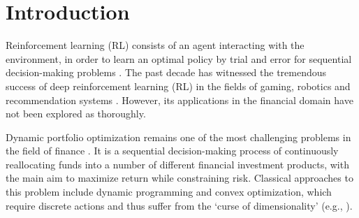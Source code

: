 \documentclass{article}
\begin{document}
\printAffiliationsAndNotice{\icmlEqualContribution} %

\begin{abstract}
{Dynamic portfolio optimization is the process of sequentially allocating wealth to a collection of assets in some consecutive trading periods, based on investors' return-risk profile. Automating this process with machine learning remains a challenging problem. Here, we design a deep reinforcement learning (RL) architecture with an autonomous trading agent such that, investment decisions and actions are made periodically, based on a global objective, with autonomy. In particular, without relying on a purely model-free RL agent, we train our trading agent using a novel RL architecture consisting of an infused prediction module (IPM), a generative adversarial data augmentation module (DAM) and a behavior cloning module (BCM). Our model-based approach works with both on-policy or off-policy RL algorithms. We further design the back-testing and execution engine which interact with the RL agent in real time. Using historical {\em real} financial market data, we simulate trading with practical constraints, and demonstrate that our proposed model is robust, profitable and risk-sensitive, as compared to baseline trading strategies and model-free RL agents from prior work.} 
\end{abstract}

\section{Introduction}

Reinforcement learning (RL) {consists of} an agent interacting with the environment, {in order to learn} an optimal policy by trial and error for sequential decision-making problems \cite{bertsekas2005dynamic, sutton2018reinforcement}. The past decade has witnessed the tremendous success of deep reinforcement learning (RL) in the fields of gaming, robotics and recommendation systems \cite{lillicrap2015continuous, silver2016mastering, mnih2015human, mnih2016asynchronous}. {However,} its applications in the financial domain have not been explored as thoroughly. 

Dynamic portfolio optimization remains one of the most challenging problems in the field of finance \cite{markowitz1959portfolio, haugen1990modern}. It is a sequential decision-making process of continuously reallocating funds into a number of different financial investment products, with the main aim to maximize return while constraining risk. Classical approaches to this problem include dynamic programming and convex optimization, which require {discrete actions} and thus suffer from the `curse of dimensionality' (e.g., \cite{cover91, li2014online, 6998078}). 
\end{document}
